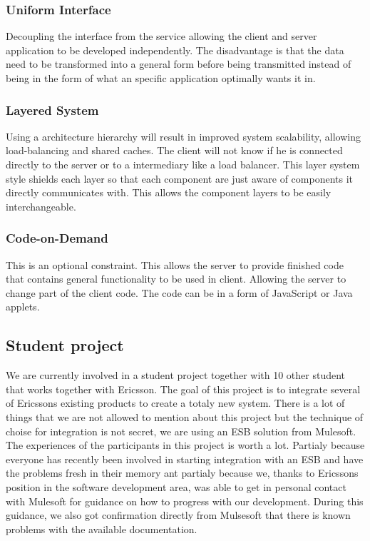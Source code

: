 \documentclass{llncs}
\begin{document}
\subsubsection{Uniform Interface}
Decoupling the interface from the service allowing the client and server application to be developed  independently. The disadvantage is that the data need to be transformed into a general form before being transmitted instead of being in the form of what an specific application optimally wants it in.

\subsubsection{Layered System}
Using a architecture hierarchy will result in improved system scalability, allowing load-balancing and shared caches. The client will not know if he is connected directly to the server or to a intermediary like a load balancer. This layer system style shields each layer so that each component are just aware of components it directly communicates with. This allows the component layers to be easily interchangeable.

\subsubsection{Code-on-Demand}
This is an optional constraint. This allows the server to provide finished code that contains general functionality to be used in client. Allowing the server to change part of the client code. The code can be in a form of JavaScript or Java applets.

\subsection{Student project}
We are currently involved in a student project together with 10 other student that works together with Ericsson. The goal of this project is to integrate several of Ericssons existing products to create a totaly new system. There is a lot of things that we are not allowed to mention about this project but the technique of choise for integration is not secret, we are using an ESB solution from Mulesoft\cite{mule}. The experiences of the participants in this project is worth a lot. Partialy because everyone has recently been involved in starting integration with an ESB and have the problems fresh in their memory ant partialy because we, thanks to Ericssons position in the software development area, was able to get in personal contact with Mulesoft for guidance on how to progress with our development. During this guidance, we also got confirmation directly from Mulsesoft that there is known problems with the available documentation.
\end{document}
